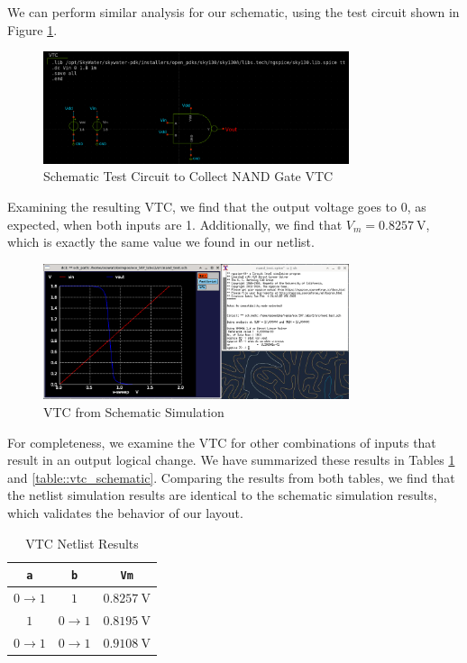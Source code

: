\documentclass{article}
\begin{document}
	\noindent We can perform similar analysis for our schematic, using the test circuit shown in Figure \ref{fig::nand_vtc_schem_test_circuit}.
	
	\begin{figure}[H]
		\centerline{\includegraphics[width=0.8\textwidth]{nand_vtc_test_circuit.png}}
		\caption{Schematic Test Circuit to Collect NAND Gate VTC}
		\label{fig::nand_vtc_schem_test_circuit}
	\end{figure}
	
	\noindent Examining the resulting VTC, we find that the output voltage goes to 0, as expected, when both inputs are 1. Additionally, we find that $V_m = 0.8257\ \text{V}$, which is exactly the same value we found in our netlist.
	
	\begin{figure}[H]
		\centerline{\includegraphics[width=0.8\textwidth]{nand_vtc_schem.png}}
		\caption{VTC from Schematic Simulation}
		\label{fig::nand_vtc_schem}
	\end{figure}	
	
	For completeness, we examine the VTC for other combinations of inputs that result in an output logical change. We have summarized these results in Tables \ref{table::vtc_netlist} and \ref{table::vtc_schematic}. Comparing the results from both tables, we find that the netlist simulation results are identical to the schematic simulation results, which validates the behavior of our layout. 
	
	\begin{table}[H]
	\begin{center}
	\caption{VTC Netlist Results}
	\label{table::vtc_netlist}
	\begin{tabular}{| c | c | c |}
		\hline
		\texttt{a} & \texttt{b} & \texttt{Vm}\\
		\hline	
		$0 \rightarrow 1$ & $1$ & $0.8257\ \text{V}$\\
		\hline	
		$1$ & $0 \rightarrow 1$ & $0.8195\ \text{V}$\\
		\hline	
		$0 \rightarrow 1$ & $0 \rightarrow 1$ & $0.9108\ \text{V}$\\
		\hline
	\end{tabular}
	\end{center}
	\end{table}
	
\end{document}
